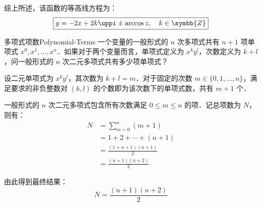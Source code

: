 \begin{solution}
    \begin{center}
    \end{center}
    综上所述，该函数的等高线方程为：
    \begin{equation}
        \boxed{y = -2x + 2k\uppi \pm \arccos z, \quad k \in \symbb{Z}}
    \end{equation}
\end{solution}


\begin{problem}{多项式项数}{Polynomial-Terms}
    一个变量的一般形式的 $n$ 次多项式共有 $n+1$ 项单项式 $x^0, x^1, \dots, x^n$．如果对于两个变量而言，单项式定义为 $x^k y^l$，次数定义为 $k+l$，问一般形式的 $n$ 次二元多项式共有多少项单项式？
\end{problem}

\begin{solution}
    设二元单项式为 $x^k y^l$，其次数为 $k+l = m$．对于固定的次数 $m \in \{0, 1, \dots, n\}$，满足要求的非负整数对 $(k, l)$ 的个数即为该次数下的单项式数，共有 $m+1$ 个．

    一般形式的 $n$ 次二元多项式包含所有次数满足 $0 \le m \le n$ 的项．记总项数为 $N$，则有：
    \begin{equation}
        \begin{aligned}
            N & = \sum_{m=0}^{n} (m+1)         \\
              & = 1 + 2 + \cdots + (n+1)       \\
              & = \frac{(1 + n + 1)(n + 1)}{2} \\
              & = \frac{(n+1)(n+2)}{2}
        \end{aligned}
    \end{equation}

    由此得到最终结果：
    \begin{equation}
        \boxed{N = \frac{(n+1)(n+2)}{2}}
    \end{equation}
\end{solution}


